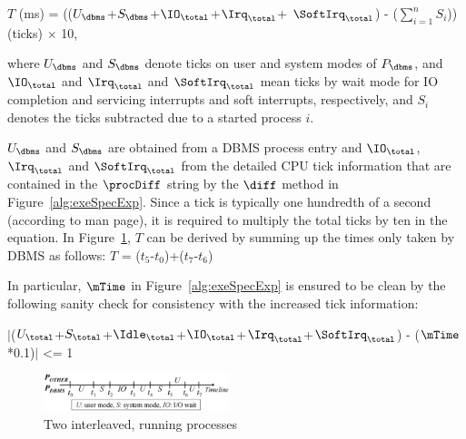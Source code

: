 \begin{center}
$T$ (ms) = (($U_{\dbms}$+$S_{\dbms}$+$\IO_{\total}$+$\Irq_{\total}$+
$\SoftIrq_{\total}$) - ($\sum_{i=1}^{n}{S_{i}}$)) (ticks) $\times$ 10, 
\end{center}
where $U_{\dbms}$ and $S_{\dbms}$ denote ticks on user and system 
modes of $P_{\dbms}$, and $\IO_{\total}$ and $\Irq_{\total}$ and 
$\SoftIrq_{\total}$ mean ticks by wait mode for IO completion 
and servicing interrupts and soft interrupts, respectively, 
and $S_{i}$ denotes the ticks subtracted due to a started process $i$. 

$U_{\dbms}$ and $S_{\dbms}$ are obtained from a DBMS process entry 
and $\IO_{\total}$, $\Irq_{\total}$ and $\SoftIrq_{\total}$ from 
the detailed CPU tick information that are contained 
in the $\procDiff$ string by the $\diff$ method in Figure~\ref{alg:exeSpecExp}. 
Since a tick is typically one hundredth of a second (according to man page), 
it is required to multiply the total ticks by ten in the equation. 
In Figure~\ref{fig:dbms_time}, $T$ can be derived by summing up 
the times only taken by DBMS as follows: 
$T$ = ($t_{5}$-$t_{0}$)+($t_{7}$-$t_{6}$) 

In particular, $\mTime$ in Figure~\ref{alg:exeSpecExp} is 
ensured to be clean by the following sanity check for consistency with 
the increased tick information: 
\begin{center}
$\vert$($U_{\total}$+$S_{\total}$+$\Idle_{\total}$+$\IO_{\total}$+$\Irq_{\total}$+$\SoftIrq_{\total}$) 
- ($\mTime$*0.1)$\vert$ <= 1 
\end{center}

\begin{figure}[t]\centering
\includegraphics[width=0.48\textwidth]{figures/dbms_time.eps}
\caption{Two interleaved, running processes\label{fig:dbms_time}}
\end{figure}